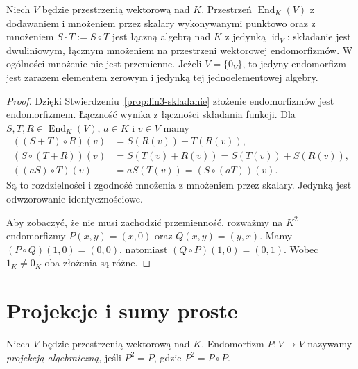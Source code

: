\begin{stwierdzenie}
\label{prop:lin3-end-algebra}
Niech \(V\) będzie przestrzenią wektorową nad \(K\).
Przestrzeń \(\operatorname{End}_K(V)\)
z dodawaniem i mnożeniem przez skalary
wykonywanymi punktowo oraz z mnożeniem
\(S\cdot T:=S\circ T\)
jest łączną algebrą nad \(K\) z jedynką
\(\operatorname{id}_V\): składanie jest
dwuliniowym, łącznym mnożeniem na
przestrzeni wektorowej endomorfizmów.
W ogólności mnożenie nie jest przemienne.
Jeżeli \(V=\{0_V\}\), to jedyny endomorfizm
jest zarazem elementem zerowym i jedynką
tej jednoelementowej algebry.
\end{stwierdzenie}
\begin{proof}
Dzięki Stwierdzeniu~\ref{prop:lin3-skladanie}
złożenie endomorfizmów jest endomorfizmem.
Łączność wynika z łączności składania funkcji.
Dla \(S,T,R\in\operatorname{End}_K(V)\),
\(a\in K\) i \(v\in V\) mamy
\[
 \begin{aligned}
 ((S+T)\circ R)(v)&=S(R(v))+T(R(v)),\\
 (S\circ(T+R))(v)&=S(T(v)+R(v))
                  =S(T(v))+S(R(v)),\\
 ((aS)\circ T)(v)&=aS(T(v))
                  =(S\circ(aT))(v).
 \end{aligned}
\]
Są to rozdzielności i zgodność
mnożenia z mnożeniem przez skalary.
Jedynką jest odwzorowanie identycznościowe.

Aby zobaczyć, że nie musi zachodzić
przemienność, rozważmy na \(K^2\)
endomorfizmy \(P(x,y)=(x,0)\)
oraz \(Q(x,y)=(y,x)\).
Mamy \((P\circ Q)(1,0)=(0,0)\),
natomiast \((Q\circ P)(1,0)=(0,1)\).
Wobec \(1_K\neq0_K\) oba złożenia są różne.
\end{proof}

\section{Projekcje i sumy proste}
\label{sec:lin3-projekcje}

\begin{definicja}
\label{def:lin3-projekcja}
Niech \(V\) będzie przestrzenią wektorową nad \(K\).
Endomorfizm \(P\colon V\to V\) nazywamy
\emph{projekcją algebraiczną}, jeśli
\(P^2=P\), gdzie \(P^2=P\circ P\).
\end{definicja}

